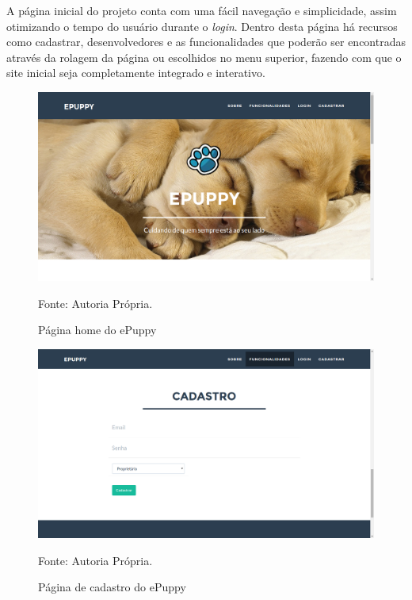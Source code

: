 A página inicial do projeto conta com uma fácil navegação e simplicidade, assim otimizando o tempo do usuário durante o {\it login}. Dentro desta página há recursos como cadastrar, desenvolvedores e as funcionalidades que poderão ser encontradas através da rolagem da página ou escolhidos no menu superior, fazendo com que o site inicial seja completamente integrado e interativo.
\begin{figure}[h!]
	\center	\includegraphics[scale=0.26
	]{imagens/principal}
	\caption{Página home do ePuppy}
	Fonte: Autoria Própria.
	\label{Rotulo}
\end{figure}
\begin{figure}[h!]
	\center	\includegraphics[scale=0.26
	]{imagens/cadastro}
	\caption{Página de cadastro do ePuppy}
	Fonte: Autoria Própria.
	\label{Rotulo}
\end{figure}

